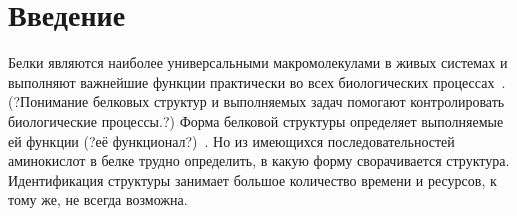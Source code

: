 \documentclass[14pt]{extarticle}
\begin{document}
\newpage


	\section{Введение}
	\label{sec:intro}
	
	Белки являются наиболее универсальными макромолекулами в живых системах и выполняют важнейшие функции практически во всех биологических процессах~\cite{berg2002biochemistry}. (?Понимание белковых структур и выполняемых задач помогают контролировать биологические процессы.?)%
	Форма белковой структуры определяет выполняемые ей функции (?её функционал?)~\cite{berg2002biochemistry}. Но из имеющихся последовательностей аминокислот в белке трудно определить, в какую форму сворачивается структура. Идентификация структуры занимает большое количество времени и ресурсов, к тому же, не всегда возможна. 
\end{document}
